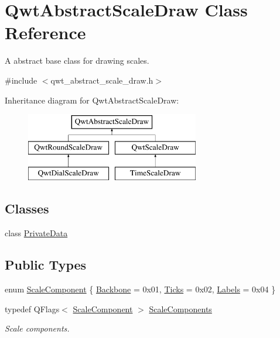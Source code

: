 \hypertarget{class_qwt_abstract_scale_draw}{\section{Qwt\-Abstract\-Scale\-Draw Class Reference}
\label{class_qwt_abstract_scale_draw}
}


A abstract base class for drawing scales.  




{\ttfamily \#include $<$qwt\-\_\-abstract\-\_\-scale\-\_\-draw.\-h$>$}

Inheritance diagram for Qwt\-Abstract\-Scale\-Draw\-:\begin{figure}[H]
\begin{center}
\leavevmode
\includegraphics[height=3.000000cm]{class_qwt_abstract_scale_draw}
\end{center}
\end{figure}
\subsection*{Classes}
\begin{DoxyCompactItemize}
\item 
class \hyperlink{class_qwt_abstract_scale_draw_1_1_private_data}{Private\-Data}
\end{DoxyCompactItemize}
\subsection*{Public Types}
\begin{DoxyCompactItemize}
\item 
enum \hyperlink{class_qwt_abstract_scale_draw_a26215d06a4d48adf401d0aa05d4193c5}{Scale\-Component} \{ \hyperlink{class_qwt_abstract_scale_draw_a26215d06a4d48adf401d0aa05d4193c5a61a6c4f4dec2b089edfb655e2b21c3a2}{Backbone} = 0x01, 
\hyperlink{class_qwt_abstract_scale_draw_a26215d06a4d48adf401d0aa05d4193c5a1f23d080ce1229a0c4f70469e88acce0}{Ticks} = 0x02, 
\hyperlink{class_qwt_abstract_scale_draw_a26215d06a4d48adf401d0aa05d4193c5ad2709d7efbb6f1618f0a8a3b6cafae96}{Labels} = 0x04
 \}
\item 
typedef Q\-Flags$<$ \hyperlink{class_qwt_abstract_scale_draw_a26215d06a4d48adf401d0aa05d4193c5}{Scale\-Component} $>$ \hyperlink{class_qwt_abstract_scale_draw_a0dd3ccdfa074fb6b1781b84ed2a4729a}{Scale\-Components}
\begin{DoxyCompactList}\small\item\em Scale components. \end{DoxyCompactList}\end{DoxyCompactItemize}
